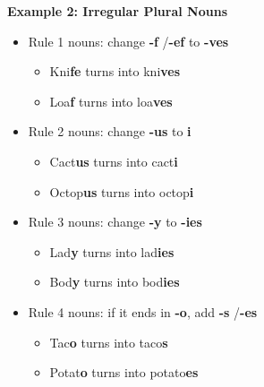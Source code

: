 \documentclass[12pt]{article}
\begin{document}
\begin{tcolorbox}[colframe=black!60, colback=white, 
coltitle=black, colbacktitle=black!15, fonttitle=\bfseries\Large, 
title=Examples, halign title=center, left=10pt, right=10pt, top=10pt, bottom=15pt]

\textbf{Example 2: Irregular Plural Nouns}
\begin{itemize}
    \item Rule 1 nouns: change \textbf{-f} /\textbf{-ef}  to \textbf{-ves}
    \begin{itemize}
        \item Kni\textbf{fe} turns into kni\textbf{ves}
        \item Loa\textbf{f} turns into loa\textbf{ves}
    \end{itemize}
\item Rule 2 nouns: change \textbf{-us} to \textbf{i}
\begin{itemize}
    \item Cact\textbf{us} turns into cact\textbf{i}
    \item Octop\textbf{us} turns into octop\textbf{i}
\end{itemize}
\item Rule 3 nouns: change \textbf{-y} to \textbf{-ies}
\begin{itemize}
    \item  Lad\textbf{y} turns into lad\textbf{ies}
    \item Bod\textbf{y} turns into bod\textbf{ies}
\end{itemize}
\item Rule 4 nouns: if it ends in \textbf{-o}, add \textbf{-s} /\textbf{-es}
\begin{itemize}
    \item Tac\textbf{o} turns into taco\textbf{s}
    \item Potat\textbf{o} turns into potato\textbf{es}
\end{itemize}
\end{itemize}

     \end{tcolorbox}
\end{document}
